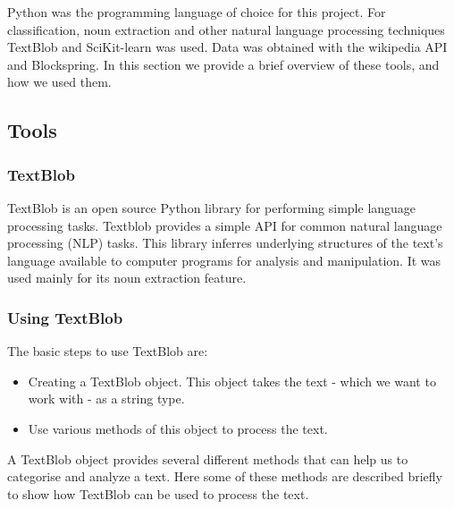 \documentclass[a4paper]{article}
\begin{document}
\noindent Python was the programming language of choice for this project. For classification, noun extraction and other natural language processing techniques TextBlob and SciKit-learn was used. Data was obtained with the wikipedia API and Blockspring. In this section we provide a brief overview of these tools, and how we used them.

\subsection{Tools}  
\subsubsection{TextBlob}

TextBlob is an open source Python library for performing simple language processing tasks. Textblob provides a simple API for common natural language processing (NLP) tasks. This library inferres underlying structures of the text's language available to computer programs for analysis and manipulation. It was used mainly for its noun extraction feature.

\subsubsection{Using TextBlob}

The basic steps to use TextBlob are:

\begin{itemize}  
\item Creating a TextBlob object. This object takes the text - which we want to work with - as a string type.
\item Use various methods of this object to process the text.
\end{itemize}

A TextBlob object provides several different methods that can help us to categorise and analyze a text. Here some of these methods are described briefly to show how TextBlob can be used to process the text. 
\end{document}

